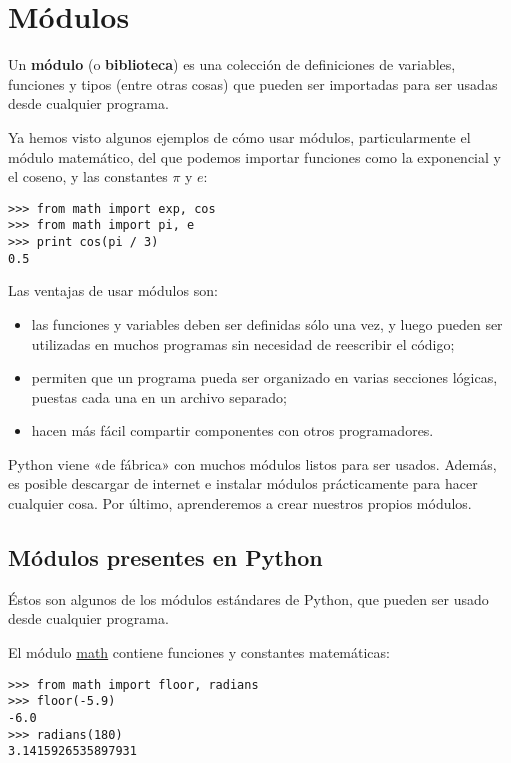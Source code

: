 \chapter{Módulos}

Un \textbf{módulo} (o \textbf{biblioteca}) es una colección de
definiciones de variables, funciones y tipos (entre otras cosas) que
pueden ser importadas para ser usadas desde cualquier programa.

Ya hemos visto algunos ejemplos de cómo usar módulos, particularmente el
módulo matemático, del que podemos importar funciones como la
exponencial y el coseno, y las constantes \(\pi\) y \(e\):

\begin{lstlisting}
>>> from math import exp, cos
>>> from math import pi, e
>>> print cos(pi / 3)
0.5
\end{lstlisting}

Las ventajas de usar módulos son:

\begin{itemize}
\item
  las funciones y variables deben ser definidas sólo una vez, y luego
  pueden ser utilizadas en muchos programas sin necesidad de reescribir
  el código;
\item
  permiten que un programa pueda ser organizado en varias secciones
  lógicas, puestas cada una en un archivo separado;
\item
  hacen más fácil compartir componentes con otros programadores.
\end{itemize}

Python viene «de fábrica» con muchos módulos listos para ser usados.
Además, es posible descargar de internet e instalar módulos
prácticamente para hacer cualquier cosa. Por último, aprenderemos a
crear nuestros propios módulos.

\section{Módulos presentes en Python}

Éstos son algunos de los módulos estándares de Python, que pueden ser
usado desde cualquier programa.

El módulo \href{http://docs.python.org/library/math.html}{math} contiene
funciones y constantes matemáticas:

\begin{lstlisting}
>>> from math import floor, radians
>>> floor(-5.9)
-6.0
>>> radians(180)
3.1415926535897931
\end{lstlisting}

